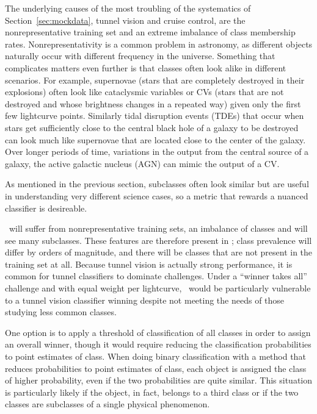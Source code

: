 The underlying causes of the most troubling of the systematics of Section~\ref{sec:mockdata}, tunnel vision and cruise control, are the nonrepresentative training set and an extreme imbalance of class membership rates.
Nonrepresentativity is a common problem in astronomy, as different objects naturally occur with different frequency in the universe.
Something that complicates matters even further is that classes often look alike in different scenarios.
For example, supernovae (stars that are completely destroyed in their explosions) often look like cataclysmic variables or CVs (stars that are not destroyed and whose brightness changes in a repeated way) given only the first few lightcurve points.
Similarly tidal disruption events (TDEs) that occur when stars get sufficiently close to the central black hole of a galaxy to be destroyed can look much like supernovae that are located close to the center of the galaxy.
Over longer periods of time, variations in the output from the central source of a galaxy, the active galactic nucleus (AGN) can mimic the output of a CV.

As mentioned in the previous section, subclasses often look similar but are useful in understanding very different science cases, so a metric that rewards a nuanced classifier is desireable.

\lsst\ will suffer from nonrepresentative training sets, an imbalance of classes and will see many subclasses.
These features are therefore present in \plasticc; class prevalence will differ by orders of magnitude, and there will be classes that are not present in the training set at all.
Because tunnel vision is actually strong performance, it is common for tunnel classifiers to dominate challenges.
Under a ``winner takes all'' challenge and with equal weight per lightcurve, \plasticc\ would be particularly vulnerable to a tunnel vision classifier winning despite not meeting the needs of those studying less common classes.

One option is to apply a threshold of classification of all classes in order to assign an overall winner, though it would require reducing the classification probabilities to point estimates of class.
When doing binary classification with a method that reduces probabilities to point estimates of class, each object is assigned the class of higher probability, even if the two probabilities are quite similar.
This situation is particularly likely if the object, in fact, belongs to a third class or if the two classes are subclasses of a single physical phenomenon.

